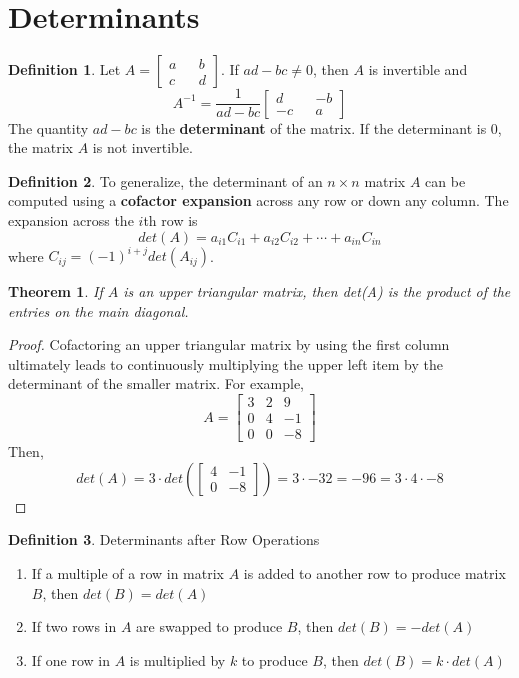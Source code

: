 \documentclass[letterpaper]{article}
\newtheorem{theorem}{Theorem}
\theoremstyle{definition}
\newtheorem{definition}{Definition}[section]
\begin{document}
\section{Determinants}
\begin{definition}
Let $A = \begin{bmatrix}
a && b \\
c && d
\end{bmatrix}$. If $ad - bc \neq 0$, then $A$ is invertible and 
$$A^{-1} = \frac{1}{ad - bc} \begin{bmatrix}
d && -b \\
-c && a
\end{bmatrix}$$
The quantity $ad - bc$ is the \textbf{determinant} of the matrix. If the determinant is 0, the matrix $A$ is not invertible. 
\end{definition}

\begin{definition}
To generalize, the determinant of an $n \times n$ matrix $A$ can be computed using a \textbf{cofactor expansion} across any row or down any column. The expansion across the $i$th row is 
$$det(A) = a_{i1}C_{i1} + a_{i2}C_{i2} + \cdots + a_{in}C_{in}$$ where $C_{ij} = (-1)^{i + j} det(A_{ij})$. 
\end{definition} 

\begin{theorem}
If $A$ is an upper triangular matrix, then det(A) is the product of the entries on the main diagonal. 
\end{theorem}

\begin{proof}
Cofactoring an upper triangular matrix by using the first column ultimately leads to continuously multiplying the upper left item by the determinant of the smaller matrix. For example, 
$$ A = \begin{bmatrix}
3 & 2 & 9 \\
0 & 4 & -1 \\
0 & 0 & -8
\end{bmatrix}$$
Then, 
$$det(A) = 3 \cdot det(\begin{bmatrix}
4 & -1 \\ 
0 & -8
\end{bmatrix}) = 3 \cdot -32 = -96 = 3 \cdot 4 \cdot -8$$
\end{proof}

\begin{definition}
Determinants after Row Operations
\begin{enumerate}
	\item If a multiple of a row in matrix $A$ is added to another row to produce matrix $B$, then $det(B) = det(A)$
	\item If two rows in $A$ are swapped to produce $B$, then $det(B) = -det(A)$
	\item If one row in $A$ is multiplied by $k$ to produce $B$, then $det(B) = k \cdot det(A)$
\end{enumerate}
\end{definition}
\end{document}
